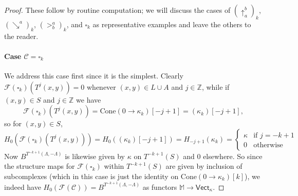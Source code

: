 \documentclass[11pt]{amsart}
\theoremstyle{definition}
\theoremstyle{remark}
\numberwithin{equation}{section}
\def\Z{\mathbb{Z}}
\begin{document}
\begin{proof}
	These follow by routine computation; we will discuss the cases of $\left(\uparrow_{a}^{b}\right)_k$, $(\searrow^a)_k$, $\left(>_{b}^{a}\right)_k$, and $\square_k$ as representative examples and leave the others to the reader.
	
\paragraph{\textbf{Case} $\mathcal{C}=\square_k$}	We address this case first since it is the simplest.  Clearly $\mathcal{F}(\square_k)(T^{j}(x,y))=0$ whenever $(x,y)\in L\cup A$ and $j\in \Z$, while if $(x,y)\in S$ and $j\in \Z$ we have \[ \mathcal{F}(\square_k)(T^{j}(x,y))=\mathrm{Cone}(0\to\kappa_{k})[-j+1]=(\kappa_k)[-j+1],\] so for $(x,y)\in S$, \[ H_0(\mathcal{F}(\square_k)(T^{j}(x,y)))=H_0((\kappa_k)[-j+1])=H_{-j+1}(\kappa_k)=\left\{\begin{array}{ll}\kappa &  \mbox{if }j=-k+1 \\ 0 & \mbox{otherwise} \end{array}\right.\]  Now $B^{T^{-k+1}(\Lambda,-\Lambda)}$ is likewise given by $\kappa$ on $T^{-k+1}(S)$ and $0$ elsewhere.  So since the structure maps for $\mathcal{F}(\square_k)$ within $T^{-k+1}(S)$ are  given by inclusion of subcomplexes (which in this case is just the identity on $\mathrm{Cone}(0\to \kappa_{k})[k]$), we indeed have $H_0(\mathcal{F}(\mathcal{C}))=B^{T^{-k+1}(\Lambda,-\Lambda)}$ as functors $\mathbb{M}\to \mathsf{Vect}_{\kappa}$.


\end{proof}
\end{document}
